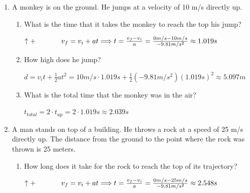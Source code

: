\documentclass[letterpaper, 12pt]{article}
\begin{document}
\begin{enumerate}
	
	
	\item A monkey is on the ground.  He jumps at a velocity of 10 m/s directly up.  
		\begin{enumerate}
		\vspace{-.1in} \item What is the time that it takes the monkey to reach the top his jump?
			
			\color{red}
			\begin{center}
				\hspace{-1in} $\uparrow+ \hspace{0.5in}  v_f = v_i + a t \Longrightarrow t = \frac{v_f-v_i}{a} = \frac{0m/s - 10m/s}{-9.81m/s^2} \approx 1.019 s 
				$
			\end{center}
			\color{black}
			
		
		
		
		\item How high does he jump?

				
			\color{red}
			\begin{center}
				\hspace{-1in} $ d = v_i t + \frac{1}{2}at^2 = 10 m/s \cdot 1.019s+ \frac{1}{2}(-9.81m/s^2)(1.019s)^2 \approx 5.097m
				$
			\end{center}
			\color{black}

		\item What is the total time that the monkey was in the air?
					
	\color{red}
	\begin{center}
	$t_{total} = 2 \cdot t_{up}  = 	2 \cdot 1.019s \approx 2.039 s	$
	\end{center}
	\color{black}
	




	\end{enumerate}
	\vspace{-.1in} \item A man stands on top of a building.  He throws a rock at a speed of 25 m/s directly up.  The distance from the ground to the point where the rock was thrown is 25 meters.
	\begin{enumerate}
		\item How long does it take for the rock to reach the top of its trajectory?
					
		\color{red}
		\begin{center}
			\vspace{-.1in} \hspace{-1in} $\uparrow+ \hspace{0.5in}  v_f = v_i + a t \Longrightarrow t = \frac{v_f-v_i}{a} = \frac{0m/s - 25m/s}{-9.81m/s^2} \approx 2.548 s 
			$
		\end{center}
		\color{black}
		

\end{enumerate}
\end{enumerate}
\end{document}
